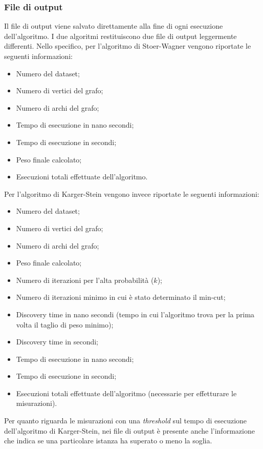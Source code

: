 \subsubsection{File di output}

Il file di output viene salvato direttamente alla fine di ogni esecuzione dell'algoritmo. I due algoritmi restituiscono due file di output leggermente differenti. Nello specifico, per l'algoritmo di Stoer-Wagner vengono riportate le seguenti informazioni:

\begin{itemize}
    \item Numero del dataset;
    \item Numero di vertici del grafo;
    \item Numero di archi del grafo;
    \item Tempo di esecuzione in nano secondi;
    \item Tempo di esecuzione in secondi;
    \item Peso finale calcolato;
    \item Esecuzioni totali effettuate dell'algoritmo.
\end{itemize}

Per l'algoritmo di Karger-Stein vengono invece riportate le seguenti informazioni:

\begin{itemize}
  \item Numero del dataset;
  \item Numero di vertici del grafo;
  \item Numero di archi del grafo;
  \item Peso finale calcolato;
  \item Numero di iterazioni per l'alta probabilità ($k$);
  \item Numero di iterazioni minimo in cui è stato determinato il min-cut;
  \item Discovery time in nano secondi (tempo in cui l'algoritmo trova per la prima volta il taglio di peso minimo);
  \item Discovery time in secondi;
  \item Tempo di esecuzione in nano secondi;
  \item Tempo di esecuzione in secondi;
  \item Esecuzioni totali effettuate dell'algoritmo (necessarie per effetturare le misurazioni).
\end{itemize}

Per quanto riguarda le misurazioni con una \textit{threshold} sul tempo di esecuzione 
dell'algoritmo di Karger-Stein, nei file di output è presente anche l'informazione 
che indica se una particolare istanza ha superato o meno la soglia.